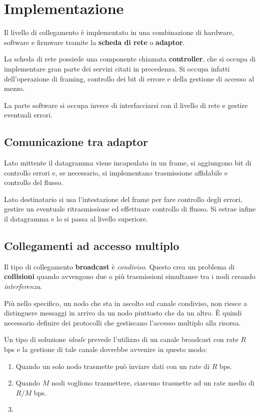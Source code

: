 \section{Implementazione}
Il livello di collegamento è implementato in una combinazione di 
hardware, software e firmware tramite la \textbf{scheda di rete} o 
\textbf{adaptor}.

La scheda di rete possiede una componente chiamata \textbf{controller},
che si occupa di implementare gran parte dei servizi citati in 
precedenza. Si occupa infatti dell'operazione di framing, controllo
dei bit di errore e della gestione di accesso al mezzo.

La parte software si occupa invece di interfacciarsi con il livello di
rete e gestire eventuali errori.

\subsection{Comunicazione tra adaptor}
Lato mittente il datagramma viene incapsulato in un frame, si 
aggiungono bit di controllo errori e, se necessario, si implementano
trasmissione affidabile e controllo del flusso.

Lato destinatario si usa l'intestazione del frame per fare controllo
degli errori, gestire un eventuale ritrasmissione ed effettuare 
controllo di flusso. Si estrae infine il datagramma e lo si passa al
livello superiore.

\subsection{Collegamenti ad accesso multiplo}
Il tipo di collegamento \textbf{broadcast} è \emph{condiviso}. Questo
crea un problema di \textbf{collisioni} quando avvengono due o più 
trasmissioni simultanee tra i nodi creando \emph{interferenza}.

Più nello specifico, un nodo che sta in ascolto sul canale condiviso,
non riesce a distinguere messaggi in arrivo da un nodo piuttosto che
da un altro. \`E quindi necessario definire dei protocolli che 
gestiscano l'accesso multiplo alla risorsa.

Un tipo di soluzione \emph{ideale} prevede l'utilizzo di un canale 
broadcast con rate $R$ bps e la gestione di tale canale dovrebbe 
avvenire in questo modo:
\begin{enumerate}
	\item Quando un solo nodo trasmette può inviare dati con un rate 
		di $R$ bps.
	\item Quando $M$ nodi vogliono trasmettere, ciascuno trasmette ad
		un rate medio di $R / M$ bps.
	\item 
\end{enumerate}
